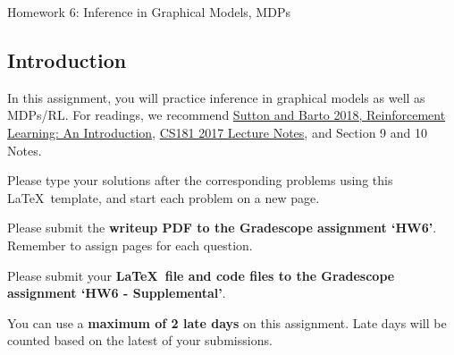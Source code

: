 \documentclass[submit]{harvardml}
\begin{document}
\begin{center}
{\Large Homework 6: Inference in Graphical Models, MDPs}\\
\end{center}

\subsection*{Introduction}

In this assignment, you will practice inference in graphical models as
well as MDPs/RL.  For readings, we recommend \href{http://incompleteideas.net/book/the-book-2nd.html}{Sutton and Barto 2018, Reinforcement Learning: An Introduction}, \href{https://harvard-ml-courses.github.io/cs181-web-2017/}{CS181 2017 Lecture Notes}, and Section 9 and 10 Notes.

Please type your solutions after the corresponding problems using this
\LaTeX\ template, and start each problem on a new page.

Please submit the \textbf{writeup PDF to the Gradescope assignment `HW6'}. Remember to assign pages for each question.

Please submit your \textbf{\LaTeX\ file and code files to the Gradescope assignment `HW6 - Supplemental'}. 

You can use a \textbf{maximum of 2 late days} on this assignment.  Late days will be counted based on the latest of your submissions. 
\\

\newpage
\end{document}
